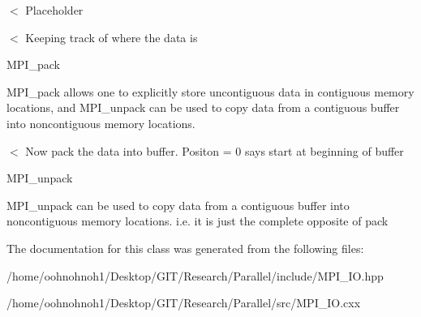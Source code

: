 $<$ Placeholder

$<$ Keeping track of where the data is

M\+P\+I\+\_\+pack

M\+P\+I\+\_\+pack allows one to explicitly store uncontiguous data in contiguous memory locations, and M\+P\+I\+\_\+unpack can be used to copy data from a contiguous buffer into noncontiguous memory locations.

$<$ Now pack the data into buffer. Positon = 0 says start at beginning of buffer

M\+P\+I\+\_\+unpack

M\+P\+I\+\_\+unpack can be used to copy data from a contiguous buffer into noncontiguous memory locations. i.\+e. it is just the complete opposite of pack

The documentation for this class was generated from the following files\+:\begin{DoxyCompactItemize}
\item 
/home/oohnohnoh1/\+Desktop/\+G\+I\+T/\+Research/\+Parallel/include/M\+P\+I\+\_\+\+I\+O.\+hpp\item 
/home/oohnohnoh1/\+Desktop/\+G\+I\+T/\+Research/\+Parallel/src/M\+P\+I\+\_\+\+I\+O.\+cxx\end{DoxyCompactItemize}
